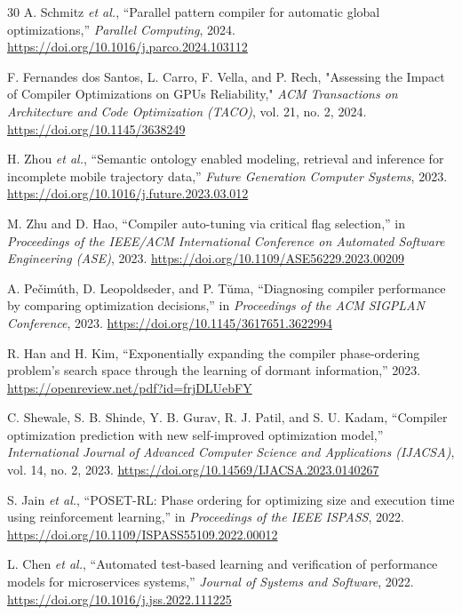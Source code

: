 \documentclass[conference]{IEEEtran}
\begin{document}
\begin{thebibliography}{30}
A. Schmitz \textit{et al.}, 
``Parallel pattern compiler for automatic global optimizations,'' 
\textit{Parallel Computing}, 2024.
\url{https://doi.org/10.1016/j.parco.2024.103112}

F. Fernandes dos Santos, L. Carro, F. Vella, and P. Rech,
"Assessing the Impact of Compiler Optimizations on GPUs Reliability,"
\textit{ACM Transactions on Architecture and Code Optimization (TACO)},
vol. 21, no. 2, 2024.
\url{https://doi.org/10.1145/3638249}

H. Zhou \textit{et al.}, 
``Semantic ontology enabled modeling, retrieval and inference for incomplete mobile trajectory data,'' 
\textit{Future Generation Computer Systems}, 2023.
\url{https://doi.org/10.1016/j.future.2023.03.012}

M. Zhu and D. Hao, 
``Compiler auto-tuning via critical flag selection,'' 
in \textit{Proceedings of the IEEE/ACM International Conference on Automated Software Engineering (ASE)}, 2023.
\url{https://doi.org/10.1109/ASE56229.2023.00209}

A. Pe\v{c}im\'{u}th, D. Leopoldseder, and P. T\u{u}ma, 
``Diagnosing compiler performance by comparing optimization decisions,'' 
in \textit{Proceedings of the ACM SIGPLAN Conference}, 2023.
\url{https://doi.org/10.1145/3617651.3622994}

R. Han and H. Kim, 
``Exponentially expanding the compiler phase-ordering problem's search space through the learning of dormant information,'' 
2023.
\url{https://openreview.net/pdf?id=frjDLUebFY}

C. Shewale, S. B. Shinde, Y. B. Gurav, R. J. Patil, and S. U. Kadam, 
``Compiler optimization prediction with new self-improved optimization model,'' 
\textit{International Journal of Advanced Computer Science and Applications (IJACSA)}, vol. 14, no. 2, 2023.
\url{https://doi.org/10.14569/IJACSA.2023.0140267}

S. Jain \textit{et al.}, 
``POSET-RL: Phase ordering for optimizing size and execution time using reinforcement learning,'' 
in \textit{Proceedings of the IEEE ISPASS}, 2022.
\url{https://doi.org/10.1109/ISPASS55109.2022.00012}

L. Chen \textit{et al.}, 
``Automated test-based learning and verification of performance models for microservices systems,'' 
\textit{Journal of Systems and Software}, 2022.
\url{https://doi.org/10.1016/j.jss.2022.111225}


\end{thebibliography}
\end{document}
